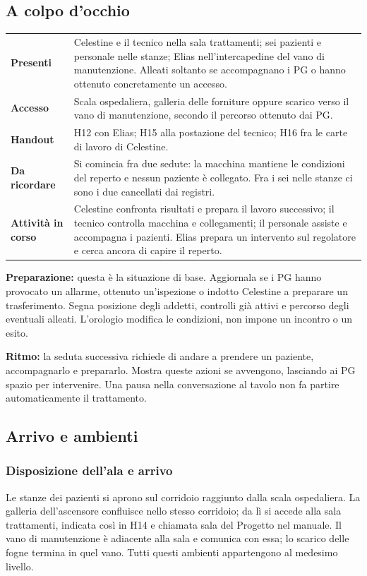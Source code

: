 \documentclass[11pt,a4paper]{article}
\begin{document}
\subsection{A colpo d'occhio}
\begin{overviewbox}
\begin{tabularx}{\linewidth}{>{\bfseries}p{32mm} X}
Presenti & Celestine e il tecnico nella sala trattamenti; sei pazienti e personale nelle stanze; Elias nell'intercapedine del vano di manutenzione. Alleati soltanto se accompagnano i PG o hanno ottenuto concretamente un accesso.\\
Accesso & Scala ospedaliera, galleria delle forniture oppure scarico verso il vano di manutenzione, secondo il percorso ottenuto dai PG.\\
Handout & H12 con Elias; H15 alla postazione del tecnico; H16 fra le carte di lavoro di Celestine.\\
Da ricordare & Si comincia fra due sedute: la macchina mantiene le condizioni del reperto e nessun paziente è collegato. Fra i sei nelle stanze ci sono i due cancellati dai registri.\\
Attività in corso & Celestine confronta risultati e prepara il lavoro successivo; il tecnico controlla macchina e collegamenti; il personale assiste e accompagna i pazienti. Elias prepara un intervento sul regolatore e cerca ancora di capire il reperto.\\
\end{tabularx}
\end{overviewbox}

\textbf{Preparazione:} questa è la situazione di base. Aggiornala se i PG hanno provocato un allarme, ottenuto un'ispezione o indotto Celestine a preparare un trasferimento. Segna posizione degli addetti, controlli già attivi e percorso degli eventuali alleati. L'orologio modifica le condizioni, non impone un incontro o un esito.

\textbf{Ritmo:} la seduta successiva richiede di andare a prendere un paziente, accompagnarlo e prepararlo. Mostra queste azioni se avvengono, lasciando ai PG spazio per intervenire. Una pausa nella conversazione al tavolo non fa partire automaticamente il trattamento.

\subsection{Arrivo e ambienti}
\subsubsection{Disposizione dell'ala e arrivo}
Le stanze dei pazienti si aprono sul corridoio raggiunto dalla scala ospedaliera. La galleria dell'ascensore confluisce nello stesso corridoio; da lì si accede alla sala trattamenti, indicata così in H14 e chiamata sala del Progetto nel manuale. Il vano di manutenzione è adiacente alla sala e comunica con essa; lo scarico delle fogne termina in quel vano. Tutti questi ambienti appartengono al medesimo livello.
\end{document}
